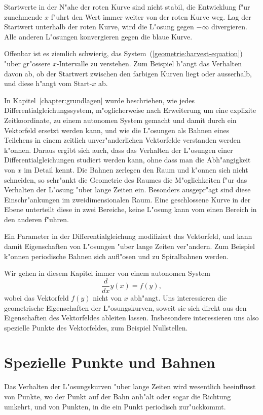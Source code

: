 Startwerte in der N"ahe der roten Kurve sind nicht stabil,
die Entwicklung f"ur zunehmende $x$ f"uhrt den Wert immer weiter von
der roten Kurve weg.
Lag der Startwert unterhalb der roten Kurve, wird die L"osung gegen
$-\infty$ divergieren.
Alle anderen L"osungen konvergieren gegen die blaue Kurve.

Offenbar ist es ziemlich schwierig, das
System~(\ref{geometrie:harvest-equation}) "uber gr"ossere $x$-Intervalle
zu verstehen. 
Zum Beispiel h"angt das Verhalten davon ab, ob der Startwert zwischen den
farbigen Kurven liegt oder ausserhalb, und diese h"angt vom Start-$x$ ab.

In Kapitel~\ref{chapter:grundlagen} wurde beschrieben, wie jedes
Differentialgleichungssystem, m"oglicherweise nach Erweiterung um eine
explizite Zeitkoordinate, zu einem autonomen System gemacht und damit
durch ein Vektorfeld ersetzt werden kann,
und wie die L"osungen als Bahnen eines Teilchens in einem zeitlich
unver"anderlichen Vektorfelde verstanden werden k"onnen.
Daraus ergibt sich auch, dass das Verhalten der L"osungen einer
Differentialgleichungen studiert werden kann, ohne dass man
die Abh"angigkeit von $x$ im Detail kennt.
Die Bahnen zerlegen den Raum und k"onnen sich nicht schneiden,
so schr"ankt die Geometrie des Raumes die M"oglichkeiten f"ur das
Verhalten der L"osung "uber lange Zeiten ein.
Besonders ausgepr"agt sind diese Einschr"ankungen im zweidimensionalen
Raum.
Eine geschlossene Kurve in der Ebene unterteilt diese in zwei Bereiche,
keine L"osung kann vom einen Bereich in den anderen f"uhren.

Ein Parameter in der Differentialgleichung modifiziert das Vektorfeld,
und kann damit Eigenschaften von L"osungen "uber lange Zeiten ver"andern.
Zum Beispiel k"onnen periodische Bahnen sich aufl"osen und zu Spiralbahnen
werden.

Wir gehen in diesem Kapitel immer von einem autonomen System
\[
\frac{d}{dx}y(x)=f(y),
\]
wobei das Vektorfeld $f(y)$ nicht von $x$ abh"angt.
Uns interessieren die geometrische Eigenschaften der L"osungskurven, 
soweit sie sich direkt aus den Eigenschaften des Vektorfeldes ableiten
lassen.
Insbesondere interessieren uns also spezielle Punkte des Vektorfeldes,
zum Beispiel Nullstellen.


%
%
\section{Spezielle Punkte und Bahnen}
Das Verhalten der L"osungskurven "uber lange Zeiten wird wesentlich
beeinflusst von Punkte, wo der Punkt auf der Bahn anh"alt oder sogar
die Richtung umkehrt, und von Punkten, in die ein Punkt periodisch
zur"uckkommt.


